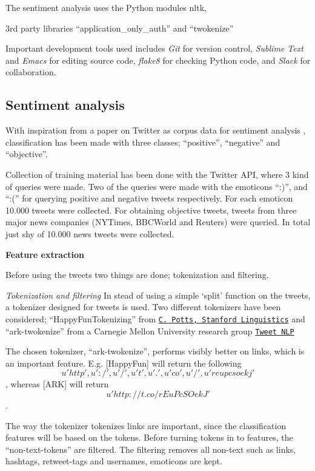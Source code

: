 \documentclass[Main]{subfiles}
\begin{document}



The sentiment analysis uses the Python modules nltk, 

3rd party libraries ``application\_only\_auth'' and ``twokenize''

Important development tools used includes \textit{Git} for version control, \textit{Sublime Text} and \textit{Emacs} for editing source code, \textit{flake8} for checking Python code, and \textit{Slack} for collaboration.




\subsection{Sentiment analysis}


With inspiration from a paper on Twitter as corpus data for sentiment analysis \cite{pak2010twitter}, classification has been made with three classes; ``positive'', ``negative'' and ``objective''.

Collection of training material has been done with the Twitter API, where 3 kind of queries were made. Two of the queries were made with the emoticons ``:)'', and ``:('' for querying positive and negative tweets respectively. For each emoticon 10.000 tweets were collected. For obtaining objective tweets, tweets from three major news companies (NYTimes, BBCWorld and Reuters) were queried. In total just shy of 10.000 news tweets were collected. 

\textbf{Feature extraction}

Before using the tweets two things are done; tokenization and filtering.

\textit{Tokenization and filtering}
In stead of using a simple `split' function on the tweets, a tokenizer designed for tweets is used. Two different tokenizers have been considered; ``HappyFunTokenizing'' from \href{http://sentiment.christopherpotts.net/tokenizing.html}{\tt C. Potts, Stanford Linguistics} and ``ark-twokenize'' from a Carnegie Mellon University research group \href{http://www.ark.cs.cmu.edu/TweetNLP/}{\tt Tweet NLP}

The chosen tokenizer, ``ark-twokenize'', performs visibly better on links, which is an important feature. E.g. [HappyFun] will return the following 
\[u'http', u':/', u'/', u't', u'.', u'co', u'/', u'reupcsoekj'\], whereas [ARK] will return \[u'http://t.co/rEuPcSOekJ'\].

The way the tokenizer tokenizes links are important, since the classification features will be based on the tokens. Before turning tokens in to features, the ``non-text-tokens'' are filtered. The filtering removes all non-text such as links, hashtags, retweet-tags and usernames, emoticons are kept. 
\end{document}
